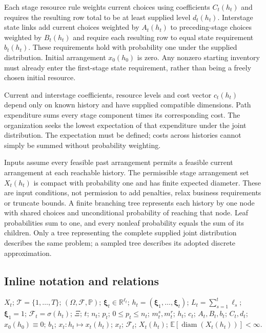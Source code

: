 \documentclass[10pt]{article}
\begin{document}
Each stage resource rule weights current choices using coefficients $C_t(h_t)$ and requires the resulting row total to be at least supplied level $d_t(h_t)$. Interstage state links add current choices weighted by $A_t(h_t)$ to preceding-stage choices weighted by $B_t(h_t)$ and require each resulting row to equal state requirement $b_t(h_t)$. These requirements hold with probability one under the supplied distribution. Initial arrangement $x_0(h_0)$ is zero. Any nonzero starting inventory must already enter the first-stage state requirement, rather than being a freely chosen initial resource.

Current and interstage coefficients, resource levels and cost vector $c_t(h_t)$ depend only on known history and have supplied compatible dimensions. Path expenditure sums every stage component times its corresponding cost. The organization seeks the lowest expectation of that expenditure under the joint distribution. The expectation must be defined; costs across histories cannot simply be summed without probability weighting.

Inputs assume every feasible past arrangement permits a feasible current arrangement at each reachable history. The permissible stage arrangement set $X_t(h_t)$ is compact with probability one and has finite expected diameter. These are input conditions, not permission to add penalties, relax business requirements or truncate bounds. A finite branching tree represents each history by one node with shared choices and unconditional probability of reaching that node. Leaf probabilities sum to one, and every nonleaf probability equals the sum of its children. Only a tree representing the complete supplied joint distribution describes the same problem; a sampled tree describes its adopted discrete approximation.

\subsection*{Inline notation and relations}
$X_t$; $\mathcal T=\{1,\ldots,T\}$; $(\Omega,\mathcal F,\mathbb P)$; $\boldsymbol\xi_t\in\mathbb R^{\ell_t}$; $h_t=(\boldsymbol\xi_1,\ldots,\boldsymbol\xi_t)$; $L_t=\sum_{s=1}^t\ell_s$; $\boldsymbol\xi_1=1$; $\mathcal F_t=\sigma(h_t)$; $\Xi$; $t$; $n_t$; $p_t$; $0\le p_t\le n_t$; $m_t^s,m_t^r$; $h_t$; $c_t$; $A_t,B_t,b_t$; $C_t,d_t$; $x_0(h_0)\equiv0$; $b_1$; $x_t: h_t\mapsto x_t(h_t)$; $x_t$; $\mathcal F_t$; $X_t(h_t)$; $\mathbb E[\operatorname{diam}(X_t(h_t))]<\infty$.
\end{document}
